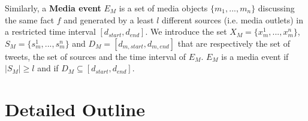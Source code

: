 Similarly, a \textbf{Media event} $E_M$ is a set of media objects
$\{m_1,...,m_n\}$  discussing the same fact $f$ and generated by a least $l$ different sources (i.e. media outlets) in a restricted time interval $[d_{start},d_{end}]$. We introduce the set 
$X_M = \{x_m^1, ..., x_m^n\}$, 
$S_M = \{s_m^1, ... ,s_m^n\}$ and 
$D_M = [d_{m,start},d_{m,end}]$ that are respectively the
set of tweets, the set of sources and the time interval of $E_M$. $E_M$ is a media event if $|S_M|  \geq l$ and if  $D_M 
\subseteq [d_{start},d_{end}]$.

\section{Detailed Outline}